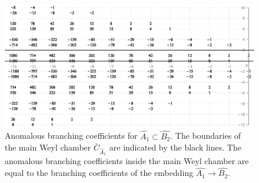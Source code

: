 \documentclass[12pt]{iopart}
\theoremstyle{definition}
\begin{document}
\begin{figure}[h!bt]
  \centering
  \includegraphics[width=120mm]{figure13.eps}
  \caption{Anomalous branching coefficients for $\hat{A_1}\subset \hat{B_2}$.
  The boundaries  of the main Weyl chamber $\bar{C}_{\hat{A}_1}$
 are indicated by the black lines. The anomalous branching coefficients
 inside the main Weyl chamber are equal to the branching coefficients of the embedding $\hat{A_1}\rightarrow \hat{B_2}$.}
  \label{fig:AffineB2_A1_branching}
\end{figure}
\end{document}
